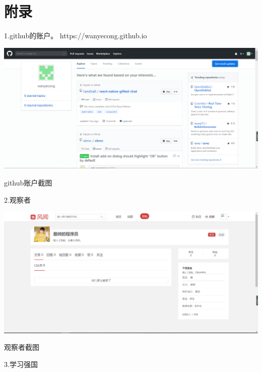 \documentclass{article}
\begin{document}
\section{附录}
1.github的账户。
https://wanyecong.github.io
\makeatletter

\def\@captype{figure}

\makeatother
\includegraphics[scale=0.2]{github}
\caption{github账户截图}
\label{fig:github}
2.观察者
\makeatletter

\def\@captype{figure}

\makeatother
\includegraphics[scale=0.2]{guanchazhe}
\caption{观察者截图}
\label{fig:guanchazhe}
3.学习强国
\makeatletter

\def\@captype{figure}
\end{document}
